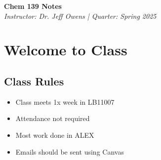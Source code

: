 \documentclass[12pt]{article}
\begin{document}
\begin{center}
    {\LARGE \textbf{Chem 139 Notes}} \\
    \vspace{0.5em}
    {\large \textit{Instructor: Dr. Jeff Owens \quad | \quad Quarter: Spring 2025}} \\
    \vspace{0.5em}
\end{center}

\tableofcontents
\newpage


\section{Welcome to Class}
\subsection{Class Rules}
\begin{itemize}
    \item Class meets 1x week in LB11007
    \item Attendance not required
    \item Most work done in ALEX
    \item Emails should be sent using Canvas
\end{itemize}
\end{document}
